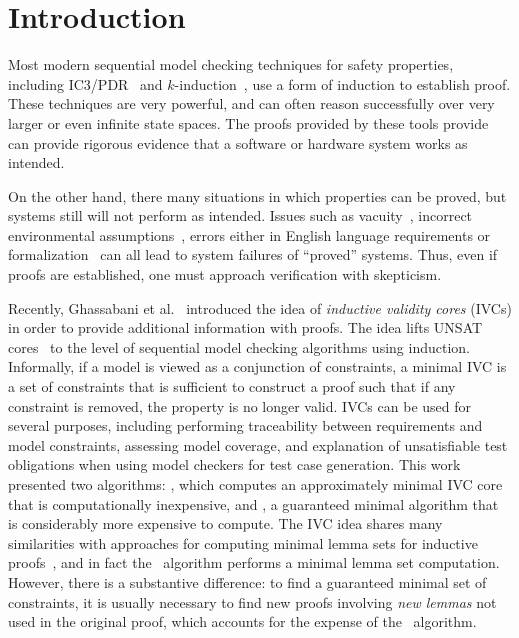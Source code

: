 \section{Introduction}
\label{sec:intro}
Most modern sequential model checking techniques for safety properties, including IC3/PDR~\cite{Een2011:PDR} and $k$-induction~\cite{SheeranSS00}, use a form of induction to establish proof.  These techniques are very powerful, and can often reason successfully over very larger or even infinite state spaces.  The proofs provided by these tools provide can provide rigorous evidence that a software or hardware system works as intended.

On the other hand, there many situations in which properties can be proved, but systems still will not perform as intended.  Issues such as vacuity~\cite{}, incorrect environmental assumptions~\cite{}, errors either in English language requirements or formalization~\cite{} can all lead to system failures of ``proved'' systems.  Thus, even if proofs are established, one must approach verification with skepticism.

Recently, Ghassabani et al.~\cite{Ghass16} introduced the idea of {\em inductive validity cores} (IVCs) in order to provide additional information with proofs.  The idea lifts UNSAT cores~\cite{zhang2003extracting} to the level of sequential model checking algorithms using induction.  Informally, if a model is viewed as a conjunction of constraints, a minimal IVC is a set of constraints that is sufficient to construct a proof such that if any constraint is removed, the property is no longer valid. IVCs can be used for several purposes, including performing traceability between requirements and model constraints, assessing model coverage, and explanation of unsatisfiable test obligations when using model checkers for test case generation.%
This work presented two algorithms: \ucalg, which computes an approximately minimal IVC core that is computationally inexpensive, and \ucbfalg, a guaranteed minimal algorithm that is considerably more expensive to compute. %
%
The IVC idea shares many similarities with approaches for computing minimal lemma sets for inductive proofs~, and in fact the \ucalg\ algorithm performs a minimal lemma set computation.  However, there is a substantive difference: to find a guaranteed minimal set of constraints, it is usually necessary to find new proofs involving {\em new lemmas} not used in the original proof, which accounts for the expense of the \ucbfalg\ algorithm.

